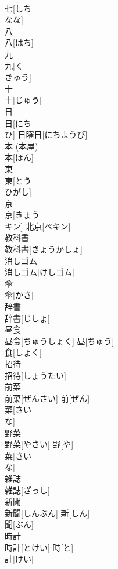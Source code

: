 \documentclass[8pt]{extreport}
\begin{document}
\begin{CJK}{UTF8}{min}
\\	七[しち 
\\	なな]	
\\	八	
\\	八[はち]	
\\	九	
\\	九[く 
\\	きゅう]	
\\	十	
\\	十[じゅう]	
\\	日	
\\	日[にち 
\\	ひ]	日曜日[にちようび] 
\\	本 (本屋)	
\\	本[ほん]	
\\	東	
\\	東[とう 
\\	ひがし]	
\\	京	
\\	京[きょう 
\\	キン]	北京[ペキン] 
\\	教科書	
\\	教科書[きょうかしょ]	
\\	消しゴム	
\\	消しゴム[けしゴム]	
\\	傘	
\\	傘[かさ]	
\\	辞書	
\\	辞書[じしょ]	
\\	昼食	
\\	昼食[ちゅうしょく]	昼[ちゅう] 
\\	食[しょく] 
\\	招待	
\\	招待[しょうたい]	
\\	前菜	
\\	前菜[ぜんさい]	前[ぜん] 
\\	菜[さい 
\\	な] 
\\	野菜	
\\	野菜[やさい]	野[や] 
\\	菜[さい 
\\	な] 
\\	雑誌	
\\	雑誌[ざっし]	
\\	新聞	
\\	新聞[しんぶん]	新[しん] 
\\	聞[ぶん] 
\\	時計	
\\	時計[とけい]	時[と] 
\\	計[けい] 

\end{CJK}
\end{document}
